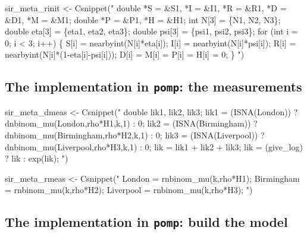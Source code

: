 \documentclass[
  letterpaper,
  DIV=11,
  numbers=noendperiod]{scrartcl}
\newenvironment{Shaded}{\begin{snugshade}}{\end{snugshade}}
\newcommand{\FunctionTok}[1]{\textcolor[rgb]{0.28,0.35,0.67}{#1}}
\newcommand{\NormalTok}[1]{\textcolor[rgb]{0.00,0.23,0.31}{#1}}
\newcommand{\OtherTok}[1]{\textcolor[rgb]{0.00,0.23,0.31}{#1}}
\newcommand{\StringTok}[1]{\textcolor[rgb]{0.13,0.47,0.30}{#1}}
\begin{document}
\begin{Shaded}
\begin{Highlighting}[]
\NormalTok{sir\_meta\_rinit }\OtherTok{\textless{}{-}} \FunctionTok{Csnippet}\NormalTok{(}\StringTok{"}
\StringTok{  double *S = \&S1, *I = \&I1, *R = \&R1, *D = \&D1, *M = \&M1;}
\StringTok{  double *P = \&P1, *H = \&H1; int N[3] = \{N1, N2, N3\};}
\StringTok{  double eta[3] = \{eta1, eta2, eta3\};}
\StringTok{  double psi[3] = \{psi1, psi2, psi3\};}
\StringTok{  for (int i = 0; i \textless{} 3; i++) \{}
\StringTok{    S[i] = nearbyint(N[i]*eta[i]); }
\StringTok{    I[i] = nearbyint(N[i]*psi[i]); }
\StringTok{    R[i] = nearbyint(N[i]*(1{-}eta[i]{-}psi[i]));}
\StringTok{    D[i] = M[i] = P[i] = H[i] = 0;}
\StringTok{  \}}
\StringTok{"}\NormalTok{)}
\end{Highlighting}
\end{Shaded}

\hypertarget{the-implementation-in-pomp-the-measurements}{%
\subsection{\texorpdfstring{The implementation in \texttt{pomp}: the
measurements}{The implementation in pomp: the measurements}}\label{the-implementation-in-pomp-the-measurements}}

\begin{Shaded}
\begin{Highlighting}[]
\NormalTok{sir\_meta\_dmeas }\OtherTok{\textless{}{-}} \FunctionTok{Csnippet}\NormalTok{(}\StringTok{"}
\StringTok{  double lik1, lik2, lik3;}
\StringTok{  lik1 = (ISNA(London)) ? dnbinom\_mu(London,rho*H1,k,1) : 0;}
\StringTok{  lik2 = (ISNA(Birmingham)) ? dnbinom\_mu(Birmingham,rho*H2,k,1) : 0;}
\StringTok{  lik3 = (ISNA(Liverpool)) ? dnbinom\_mu(Liverpool,rho*H3,k,1) : 0;}
\StringTok{  lik = lik1 + lik2 + lik3;}
\StringTok{  lik = (give\_log) ? lik : exp(lik);}
\StringTok{"}\NormalTok{)}

\NormalTok{sir\_meta\_rmeas }\OtherTok{\textless{}{-}} \FunctionTok{Csnippet}\NormalTok{(}\StringTok{"}
\StringTok{  London = rnbinom\_mu(k,rho*H1);}
\StringTok{  Birmingham = rnbinom\_mu(k,rho*H2);}
\StringTok{  Liverpool = rnbinom\_mu(k,rho*H3);}
\StringTok{"}\NormalTok{)}
\end{Highlighting}
\end{Shaded}

\hypertarget{the-implementation-in-pomp-build-the-model}{%
\subsection{\texorpdfstring{The implementation in \texttt{pomp}: build
the
model}{The implementation in pomp: build the model}}\label{the-implementation-in-pomp-build-the-model}}
\end{document}
